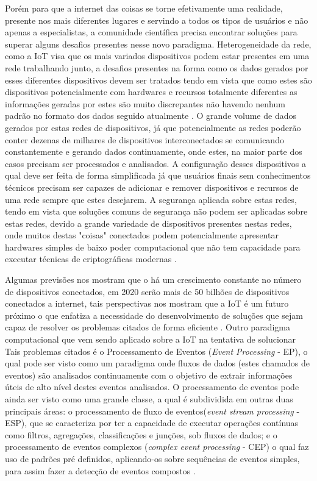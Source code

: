 \documentclass[ti,table]{texufpel} %
\begin{document}
Porém para que a internet das coisas se torne efetivamente uma realidade, presente nos mais diferentes lugares e servindo a todos os tipos de usuários e não apenas a especialistas, a comunidade científica precisa encontrar soluções para superar alguns desafios presentes nesse novo paradigma. Heterogeneidade da rede, como a IoT visa que os mais variados dispositivos podem estar presentes em uma rede trabalhando junto, a desafios presentes na forma como os dados gerados por esses diferentes dispositivos devem ser tratados tendo em vista que como estes são dispositivos potencialmente com hardwares e recursos totalmente diferentes as informações geradas por estes são muito discrepantes não havendo nenhum padrão no formato dos dados seguido atualmente \cite{agrawal2013survey}. O grande volume de dados gerados por estas redes de dispositivos, já que potencialmente as redes poderão conter dezenas de milhares de dispositivos interconectados se comunicando constantemente e gerando dados continuamente, onde estes, na maior parte dos casos precisam ser processados e analisados. A configuração desses dispositivos a qual deve ser feita de forma simplificada já que usuários finais sem conhecimentos técnicos precisam ser capazes de adicionar e remover dispositivos e recursos de uma rede sempre que estes desejarem. A segurança aplicada sobre estas redes, tendo em vista que soluções comuns de segurança não podem ser aplicadas sobre estas redes,  devido a grande variedade de dispositivos presentes nestas redes, onde muitos destas "coisas" conectados podem potencialmente apresentar hardwares simples de baixo poder computacional que não tem capacidade para executar técnicas de criptográficas modernas \cite{agrawal2013survey}.


Algumas previsões nos mostram que o há um crescimento constante no número de dispositivos conectados, em 2020 serão mais de 50 bilhões de dispositivos conectados a internet, tais perspectivas nos mostram que a IoT é um futuro próximo o que enfatiza a necessidade do desenvolvimento de soluções que sejam capaz de resolver os problemas citados de forma eficiente \cite{xavier2016smart}. Outro paradigma computacional que vem sendo aplicado sobre a IoT na tentativa de solucionar Tais problemas citados é o  Processamento de Eventos (\textit{Event Processing} - EP), o qual pode ser visto como um paradigma onde fluxos de dados (estes chamados de eventos) são analisados continuamente com o objetivo de extrair informações úteis de alto nível destes eventos analisados. O processamento de eventos pode ainda ser visto como uma grande classe, a qual é subdividida em outras duas principais áreas: o processamento de fluxo de eventos(\textit{event stream processing} - ESP), que se caracteriza por ter a capacidade de executar operações contínuas como filtros, agregações, classificações e junções, sob fluxos de dados; e o processamento de eventos complexos (\textit{complex event processing} - CEP) o qual faz uso de padrões pré definidos, aplicando-os sobre sequências de eventos simples, para assim fazer a detecção de eventos compostos \cite{dayarathna2018recent}.
\end{document}
